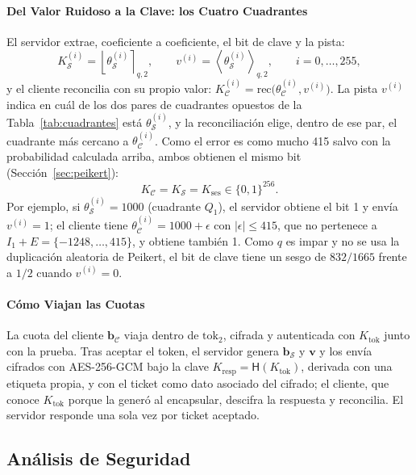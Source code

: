 \paragraph{Del Valor Ruidoso a la Clave: los Cuatro Cuadrantes}
El servidor extrae, coeficiente a coeficiente, el bit de clave y la pista:
\begin{equation}
K_{\mathcal{S}}^{(i)} = \left\lfloor \theta_{\mathcal{S}}^{(i)} \right\rceil_{q,2}, \qquad v^{(i)} = \left\langle \theta_{\mathcal{S}}^{(i)} \right\rangle_{q,2}, \qquad i = 0, \dots, 255,
\end{equation}
y el cliente reconcilia con su propio valor: $K_{\mathcal{C}}^{(i)} = \mathrm{rec}\big(\theta_{\mathcal{C}}^{(i)}, v^{(i)}\big)$. La pista $v^{(i)}$ indica en cuál de los dos pares de cuadrantes opuestos de la Tabla~\ref{tab:cuadrantes} está $\theta_{\mathcal{S}}^{(i)}$, y la reconciliación elige, dentro de ese par, el cuadrante más cercano a $\theta_{\mathcal{C}}^{(i)}$. Como el error es como mucho 415 salvo con la probabilidad calculada arriba, ambos obtienen el mismo bit (Sección~\ref{sec:peikert}):
\begin{equation}
K_{\mathcal{C}} = K_{\mathcal{S}} = K_{\text{ses}} \in \{0, 1\}^{256}.
\end{equation}
Por ejemplo, si $\theta_{\mathcal{S}}^{(i)} = 1000$ (cuadrante $Q_1$), el servidor obtiene el bit 1 y envía $v^{(i)} = 1$; el cliente tiene $\theta_{\mathcal{C}}^{(i)} = 1000 + \epsilon$ con $|\epsilon| \le 415$, que no pertenece a $I_1 + E = \{-1248, \dots, 415\}$, y obtiene también 1. Como $q$ es impar y no se usa la duplicación aleatoria de Peikert, el bit de clave tiene un sesgo de $832/1665$ frente a $1/2$ cuando $v^{(i)} = 0$.

\paragraph{Cómo Viajan las Cuotas}
La cuota del cliente $\mathbf{b}_{\mathcal{C}}$ viaja dentro de $\text{tok}_2$, cifrada y autenticada con $K_{\text{tok}}$ junto con la prueba. Tras aceptar el token, el servidor genera $\mathbf{b}_{\mathcal{S}}$ y $\mathbf{v}$ y los envía cifrados con AES-256-GCM bajo la clave $K_{\text{resp}} = \mathsf{H}(K_{\text{tok}})$, derivada con una etiqueta propia, y con el ticket como dato asociado del cifrado; el cliente, que conoce $K_{\text{tok}}$ porque la generó al encapsular, descifra la respuesta y reconcilia. El servidor responde una sola vez por ticket aceptado.

\subsection{Análisis de Seguridad}
\label{sec:pqlite-seguridad}

